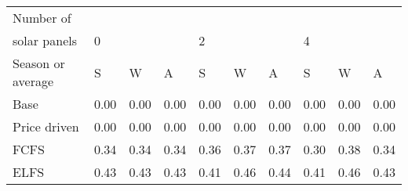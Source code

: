 \begin{table}[h] 
\centering 
\begin{tabular}{l|lll|lll|lll}Number of \\ solar panels&0& & &2& & &4& & \\ \hline 
Season or average & S & W & A & S & W & A & S & W & A \\ \hline 
Base&0.00&0.00&0.00&0.00&0.00&0.00&0.00&0.00&0.00 \\ 
Price driven&0.00&0.00&0.00&0.00&0.00&0.00&0.00&0.00&0.00 \\ 
FCFS&0.34&0.34&0.34&0.36&0.37&0.37&0.30&0.38&0.34 \\ 
ELFS&0.43&0.43&0.43&0.41&0.46&0.44&0.41&0.46&0.43 \\ 
\end{tabular} 
\end{table}